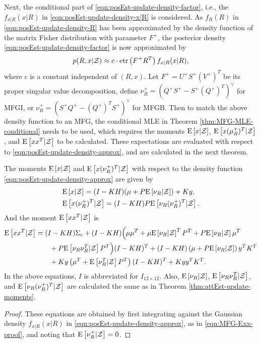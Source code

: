 Next, the conditional part of \eqref{eqn:posEst-update-density-factor}, i.e., the $f_{x|R}(x|R)$ in \eqref{eqn:posEst-update-density-x|R} is considered.
As $f_R(R)$ in \eqref{eqn:posEst-update-density-R} has been approximated by the density function of the matrix Fisher distribution with parameter $F^+$, the posterior density \eqref{eqn:posEst-update-density-factor} is now approximated by
\begin{align} \label{eqn:posEst-update-density-approx}
	p(R,x|\mathcal{Z}) \approx c \cdot \mathrm{etr}\left( F^+R^T \right) f_{x|R}(x|R),
\end{align}
where $c$ is a constant independent of $(R,x)$.
Let $F^+ = U^+S^+(V^+)^T$ be its proper singular value decomposition, define $\nu_R^+ = (Q^+S^+ - S^+(Q^+)^T)^\vee$ for MFGI, or $\nu_R^+ = (S^+Q^+ - (Q^+)^TS^+)^\vee$ for MFGB.
Then to match the above density function to an MFG, the conditional MLE in Theorem \ref{thm:MFG-MLE-conditional} needs to be used, which requires the moments $\mathrm{E}\left[ x|\mathcal{Z} \right]$, $\mathrm{E}\left[ x(\mu_R^+)^T|\mathcal{Z} \right]$, and $\mathrm{E}\left[ xx^T|\mathcal{Z} \right]$ to be calculated.
These expectations are evaluated with respect to \eqref{eqn:posEst-update-density-approx}, and are calculated in the next theorem.

\begin{theorem} \label{thm:posEst-update-moments}
	The moments $\mathrm{E}\left[ x|\mathcal{Z} \right]$ and $\mathrm{E}\left[ x(\nu_R^+)^T|\mathcal{Z} \right]$ with respect to the density function \eqref{eqn:posEst-update-density-approx} are given by
	\begin{align}
		&\mathrm{E}\left[ x|\mathcal{Z} \right] = (I-KH)(\mu+P\mathrm{E}\left[ \nu_R|\mathcal{Z} \right]) + Ky, \\
		&\mathrm{E}\left[ x(\nu_R^+)^T|\mathcal{Z} \right] = (I-KH)P\mathrm{E}\left[ \nu_R(\nu_R^+)^T|\mathcal{Z} \right].
	\end{align}
	And the moment $\mathrm{E}\left[ xx^T|\mathcal{Z} \right]$ is
	\begin{align}
		\mathrm{E}\left[ xx^T|\mathcal{Z} \right] &= (I-KH)\Sigma_c + (I-KH) \Big( \mu\mu^T + \mu\mathrm{E}\left[ \nu_R|\mathcal{Z} \right]^TP^T + P\mathrm{E}\left[ \nu_R|\mathcal{Z} \right]\mu^T \nonumber \\
		&\qquad + P\mathrm{E}\left[ \nu_R\nu_R^T|\mathcal{Z} \right]P^T \Big) (I-KH)^T + (I-KH)\left( \mu + P\mathrm{E}\left[ \nu_R|\mathcal{Z} \right] \right)y^TK^T \nonumber \\
		&\qquad + Ky\left(\mu^T + \mathrm{E}\left[ \nu_R^T|\mathcal{Z} \right]P^T\right)(I-KH)^T + Kyy^TK^T.
	\end{align}
	In the above equations, $I$ is abbreviated for $I_{12\times 12}$.
	Also, $\mathrm{E}\left[ \nu_R|\mathcal{Z} \right]$, $\mathrm{E}\left[ \nu_R\nu_R^T|\mathcal{Z} \right]$, and $\mathrm{E}\left[ \nu_R(\nu_R^+)^T|\mathcal{Z} \right]$ are calculated the same as in Theorem \ref{thm:attEst-update-moments}.
\end{theorem}
\begin{proof}
	These equations are obtained by first integrating against the Gaussian density $f_{x|R}(x|R)$ in \eqref{eqn:posEst-update-density-approx}, as in \eqref{eqn:MFG-Exx-proof}, and noting that $\mathrm{E}\left[ \nu_R^+|\mathcal{Z} \right] = 0$.
\end{proof}

